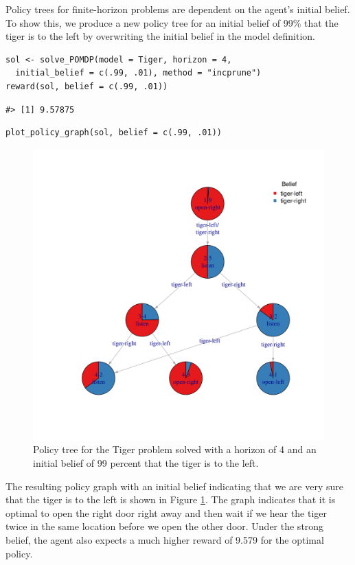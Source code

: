 Policy trees for finite-horizon problems are dependent on the agent's
initial belief. To show this, we produce a new policy tree
for an initial belief of 99\% that the tiger is to the left by overwriting the initial belief in the model definition.

\begin{verbatim}
sol <- solve_POMDP(model = Tiger, horizon = 4, 
  initial_belief = c(.99, .01), method = "incprune")
reward(sol, belief = c(.99, .01))
\end{verbatim}

\begin{verbatim}
#> [1] 9.57875
\end{verbatim}

\begin{verbatim}
plot_policy_graph(sol, belief = c(.99, .01))
\end{verbatim}

\begin{figure}
\includegraphics[width=1\linewidth]{pomdp_files/figure-latex/tiger-finite-horizon-99-1} \caption{Policy tree for the Tiger problem solved with a horizon of 4 and an initial belief of 99 percent that the tiger is to the left.}\label{fig:tiger-finite-horizon-99}
\end{figure}

The resulting policy graph with an initial belief indicating that we are very sure that the tiger
is to the left is shown in Figure \ref{fig:tiger-finite-horizon-99}. The graph
indicates that it is optimal to open the right door right away and then wait if we hear the tiger twice in the same location before we open the other door.
Under the strong belief, the agent also expects a much higher reward of
9.579 for the optimal policy.

